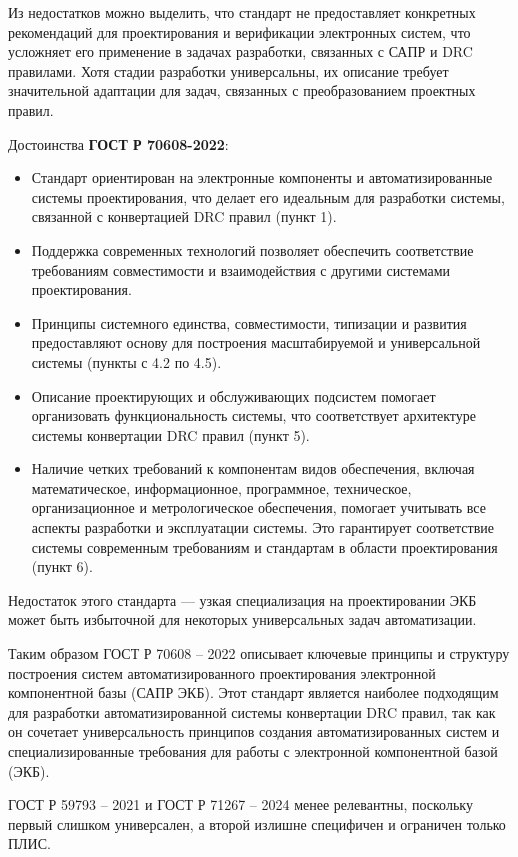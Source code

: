 Из недостатков можно выделить,
что стандарт не предоставляет конкретных рекомендаций для проектирования
и верификации электронных систем,
что усложняет его применение в задачах разработки,
связанных с САПР и DRC правилами.
Хотя стадии разработки универсальны,
их описание требует значительной адаптации для задач,
связанных с преобразованием проектных правил.

Достоинства \textbf{ГОСТ Р 70608-2022}:

\begin{itemize}
	\item Стандарт ориентирован на электронные компоненты
		и автоматизированные системы проектирования,
		что делает его идеальным для разработки системы,
		связанной с конвертацией DRC правил (пункт 1).
	\item Поддержка современных технологий позволяет обеспечить
		соответствие требованиям совместимости
		и взаимодействия с другими системами проектирования.
	\item Принципы системного единства, совместимости, типизации
		и развития предоставляют основу для построения масштабируемой
		и универсальной системы (пункты с 4.2 по 4.5).
	\item Описание проектирующих
		и обслуживающих подсистем помогает организовать
		функциональность системы, что соответствует архитектуре
		системы конвертации DRC правил (пункт 5).
	\item Наличие четких требований к компонентам видов обеспечения,
		включая математическое, информационное, программное, техническое,
		организационное и метрологическое обеспечения,
		помогает учитывать все аспекты разработки и эксплуатации системы.
		Это гарантирует соответствие системы современным требованиям
		и стандартам в области проектирования (пункт 6).
\end{itemize}

Недостаток этого стандарта --- узкая специализация
на проектировании ЭКБ может быть избыточной
для некоторых универсальных задач автоматизации.

Таким образом ГОСТ Р 70608 -- 2022 описывает ключевые принципы
и структуру построения систем автоматизированного проектирования
электронной компонентной базы (САПР ЭКБ).
Этот стандарт является наиболее подходящим
для разработки автоматизированной системы конвертации DRC правил,
так как он сочетает универсальность принципов
создания автоматизированных систем
и специализированные требования
для работы с электронной компонентной базой (ЭКБ).

ГОСТ Р 59793 -- 2021 и ГОСТ Р 71267 -- 2024 менее релевантны,
поскольку первый слишком универсален,
а второй излишне специфичен и ограничен только ПЛИС.

